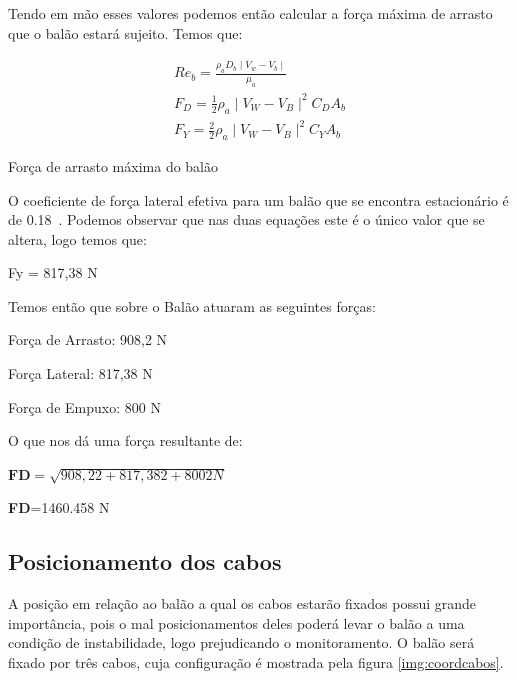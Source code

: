 	Tendo em mão esses valores podemos então calcular a força máxima de arrasto que o balão estará sujeito. Temos que:

	\begin{equacao}[H]
		\begin{equation}
			\begin{multlined}
				Re_{b} = \frac{\rho_{a} D_{b} \mid V_{w} - V_{b} \mid}{\mu_{a}}\\
				F_{D} = \frac{1}{2} \rho_{a} \mid V_{W} - V_{B} \mid^{2} C_{D} A_{b}\\
				F_{Y} = \frac{2}{2} \rho_{a} \mid V_{W} - V_{B} \mid^{2} C_{Y} A_{b}
			\end{multlined}
		\end{equation}
		\caption{Força de arrasto máxima do balão}
		\label{eqn:forcaArrastoMax}
	\end{equacao}

	O coeficiente de força lateral efetiva para um balão que se encontra estacionário é de 0.18~\cite{ferguson}. Podemos observar que nas duas equações este é o único valor que se altera, logo temos que:

	Fy = 817,38 N

	Temos então que sobre o Balão atuaram as seguintes forças:

	Força de Arrasto: 908,2 N

	Força Lateral: 817,38 N

	Força de Empuxo: 800 N

	O que nos dá uma força resultante de:

	$\textbf{FD}= \sqrt{908,22+ 817,382+8002N}$

	\textbf{FD}=1460.458 N

\subsection{Posicionamento dos cabos}

	A posição em relação ao balão a qual os cabos estarão fixados possui grande importância, pois o mal posicionamentos deles poderá levar o balão a uma condição de instabilidade, logo prejudicando o monitoramento. O balão será fixado por três cabos, cuja  configuração é mostrada pela figura \ref{img:coordcabos}.

